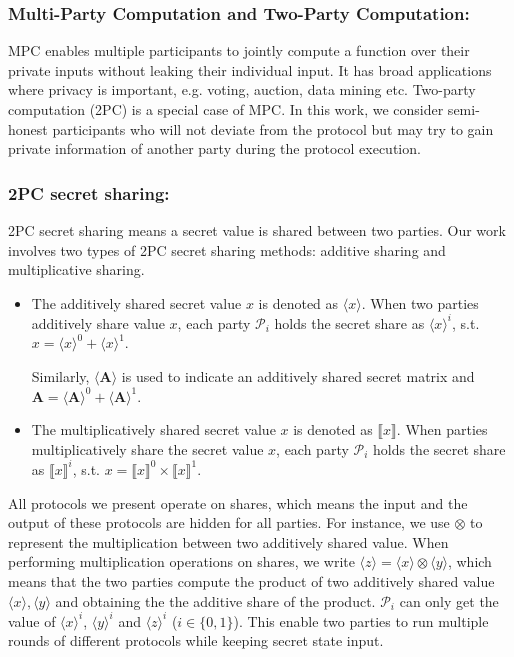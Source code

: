 \documentclass[letterpaper]{article} %
\begin{document}
    \subsubsection{Multi-Party Computation and Two-Party Computation:}
    MPC enables multiple participants to jointly compute a function over their private inputs without leaking
	their individual input. It has broad applications where privacy is important, e.g. voting, auction,
	data mining etc. Two-party computation (2PC) is a special case of MPC.
    In this work, we consider semi-honest participants
    who will not deviate from the protocol but may try to gain private information of another party
		during the protocol execution.


        \subsubsection{2PC secret sharing:}
    2PC secret sharing means a secret value is shared between two parties.
    Our work involves two types of 2PC secret sharing methods:
    additive sharing and multiplicative sharing.
    \begin{itemize}
        \item
        The additively shared secret value $x$ is denoted as $\langle x\rangle $.
        When two parties additively share value $x$,
        each party $\mathcal{P}_{i}$ holds the secret share as $\langle x\rangle ^{i}$, s.t.
        $x=\langle x\rangle ^{0}+\langle x\rangle ^{1}$.

        Similarly, $\langle \mathbf{A}\rangle $ is used to indicate an additively shared secret matrix
        and $\mathbf{A} =\langle \mathbf{A}\rangle ^{0}+\langle \mathbf{A}\rangle ^{1}$.

        \item The multiplicatively shared secret value $x$ is denoted as $\llbracket x \rrbracket$.
        When parties multiplicatively share the secret value $x$,
        each party $\mathcal{P}_{i}$ holds the secret share as $\llbracket x \rrbracket ^{i}$, s.t.
        $x=\llbracket x \rrbracket ^{0}\times \llbracket x \rrbracket ^{1}$.

    \end{itemize}


    All protocols we present operate on shares, which means
    the input and the output of these protocols are hidden for all parties.
    For instance, we use $\otimes$ to represent the multiplication between two additively shared value.
    When performing multiplication operations on shares,
    we write $\langle z\rangle=\langle x\rangle\otimes  \langle y\rangle $,
    which means that the two parties compute the product of two additively shared value
    $\langle x\rangle, \langle y\rangle$ and obtaining the
    the additive share of the product.
    $\mathcal{P}_{i}$ can only get the value of $\langle x\rangle ^{i}$, $\langle y\rangle ^{i}$ and $\langle z\rangle ^{i}$ ($i \in \{0,1\}$).
    This enable two parties to run multiple rounds of different protocols while keeping secret state input.
\end{document}
